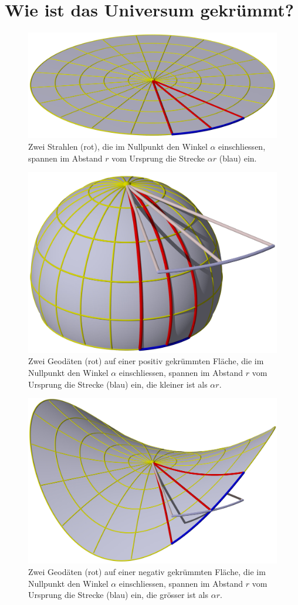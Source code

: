 \section{Wie ist das Universum gekrümmt?}
\begin{figure}
\centering
\includegraphics[width=0.7\hsize]{chapters/3d/pringles-flach.jpg}
\caption{Zwei Strahlen (rot), die im Nullpunkt den Winkel $\alpha$
einschliessen, spannen im Abstand $r$ vom Ursprung die Strecke
$\alpha r$ (blau) ein.
\label{skript:pringles:flach}}
\end{figure}
%
\begin{figure}
\centering
\includegraphics[width=0.7\hsize]{chapters/3d/pringles-positiv.jpg}
\caption{Zwei Geodäten (rot) auf einer positiv gekrümmten Fläche,
die im Nullpunkt den Winkel $\alpha$ einschliessen, spannen im Abstand
$r$ vom Ursprung die Strecke (blau) ein, die kleiner ist als
$\alpha r$.
\label{skript:pringles:positiv}}
\end{figure}
%
\begin{figure}
\centering
\includegraphics[width=0.9\hsize]{chapters/3d/pringles-negativ.jpg}
\caption{Zwei Geodäten (rot) auf einer negativ gekrümmten Fläche,
die im Nullpunkt den Winkel $\alpha$ einschliessen, spannen im Abstand
$r$ vom Ursprung die Strecke (blau) ein, die grösser ist als
$\alpha r$.
\label{skript:pringles:negativ}}
\end{figure}
